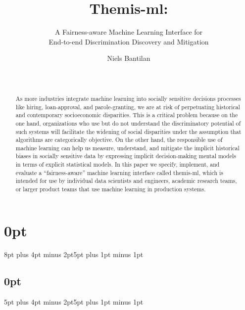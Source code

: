 \documentclass{acm_proc_article-sp}
\begin{document}
\titlespacing\section{0pt}{8pt plus 4pt minus 2pt}{5pt plus 1pt minus 1pt}
\titlespacing\subsection{0pt}{5pt plus 4pt minus 2pt}{5pt plus 1pt minus 1pt}



\title{
  Themis-ml:
}
\subtitle{
    A Fairness-aware Machine Learning Interface for \\
    End-to-end Discrimination Discovery and Mitigation
}


\author{
\alignauthor
Niels Bantilan\\
       \\
       \\
}

\maketitle

\begin{abstract}
As more industries integrate machine learning into socially sensitive decisions
processes like hiring, loan-approval, and parole-granting, we are at risk of
perpetuating historical and contemporary socioeconomic disparities. This is a
critical problem because on the one hand, organizations who use but do not
understand the discriminatory potential of such systems will facilitate the
widening of social disparities under the assumption that algorithms are
categorically objective. On the other hand, the responsible use of machine
learning can help us measure, understand, and mitigate the implicit historical
biases in socially sensitive data by expressing implicit decision-making mental
models in terms of explicit statistical models. In this paper we specify,
implement, and evaluate a ``fairness-aware'' machine learning interface called
themis-ml, which is intended for use by individual data scientists and
engineers, academic research teams, or larger product teams that use machine
learning in production systems.
\end{abstract}
\end{document}
